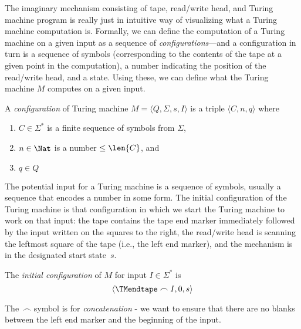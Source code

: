 \documentclass[../../../include/open-logic-section]{subfiles}
\begin{document}

\begin{explain}
The imaginary mechanism consisting of tape, read/write head, and
Turing machine program is really just in intuitive way of visualizing
what a Turing machine computation is.  Formally, we can define the
computation of a Turing machine on a given input as a sequence of
\emph{configurations}---and a configuration in turn is a sequence of
symbols (corresponding to the contents of the tape at a given point in
the computation), a number indicating the position of the read/write
head, and a state.  Using these, we can define what the Turing machine
$M$ computes on a given input.
\end{explain}

\begin{defn}
A \emph{configuration} of Turing machine $M = \langle Q, \Sigma, s,
I\rangle$ is a triple $\langle C, n, q\rangle$ where
\begin{enumerate}
\item $C \in \Sigma^*$ is a finite sequence of symbols from $\Sigma$,
\item $n \in \Nat$ is a number $\le \len{C}$, and
\item $q \in Q$
\end{enumerate}
\end{defn}

\begin{explain}
The potential input for a Turing machine is a sequence of symbols,
usually a sequence that encodes a number in some form.  The initial
configuration of the Turing machine is that configuration in which we
start the Turing machine to work on that input: the tape contains the
tape end marker immediately followed by the input written on the
squares to the right, the read/write head is scanning the leftmost
square of the tape (i.e., the left end marker), and the mechanism is
in the designated start state~$s$.
\end{explain}

\begin{defn}
The \emph{initial configuration} of $M$ for input $I \in \Sigma^*$ is
\[
\langle \TMendtape \frown I, 0, s\rangle
\]
\end{defn}

\begin{explain}
The~$\frown$ symbol is for \emph{concatenation} - we want to
ensure that there are no blanks between the left end marker and
the beginning of the input.
\end{explain}
\end{document}
